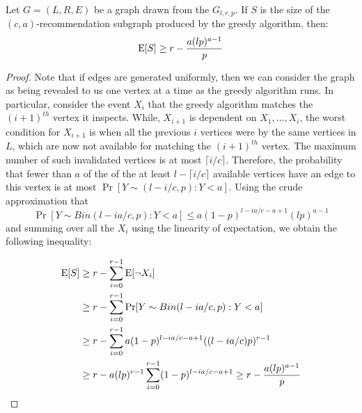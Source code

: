 \begin{thm}
Let $G=(L,R,E)$ be a graph drawn from the $G_{l,r,p}$. If $S$ is the size of the $(c,a)$-recommendation subgraph produced by the greedy algorithm, then:
\[ \text{E}[S] \geq r - \frac{a(lp)^{a-1}}{p}\]
\end{thm}
\begin{proof}
Note that if edges are generated uniformly, then we can consider the
graph as being revealed to us one vertex at a time as the greedy
algorithm runs. In particular, consider the event $X_i$ that the
greedy algorithm matches the $(i+1)^{th}$ vertex it inspects. While,
$X_{i+1}$ is dependent on $X_1,\ldots, X_i$, the worst condition for
$X_{i+1}$ is when all the previous $i$ vertices were by the same
vertices in $L$, which are now not available for matching the
$(i+1)^{th}$ vertex. The maximum number of such invalidated vertices
is at most $\lceil i/c \rceil$. Therefore, the probability that fewer
than $a$ of the of the at least $l-\lceil i/c \rceil $ available 
vertices have an edge to this vertex is at most $\Pr[Y\sim (l-i/c,p): Y < a]$.
Using the crude approximation that
\[ \Pr[Y\sim Bin(l-ia/c,p): Y < a] \leq a(1-p)^{l-ia/c-a+1}(lp)^{a-1}\]
and summing over all the $X_i$ using the linearity of expectation,
we obtain the following inequality:

\begin{align*}
      \text{E}[S]
&\geq r - \sum_{i=0}^{r-1} \text{E}[\lnot X_i] \\
&\geq r - \sum_{i=0}^{r-1} \Pr[Y \sim Bin(l-ia/c,p): Y < a] \\
&\geq r - \sum_{i=0}^{r-1}a(1-p)^{l-ia/c-a+1}((l-ia/c)p)^{r-1} \\
&\geq r - a(lp)^{r-1}\sum_{i=0}^{r-1}(1-p)^{l-ia/c-a+1} \geq r - \frac{a(lp)^{a-1}}{p}\\
\end{align*}
\end{proof} 
